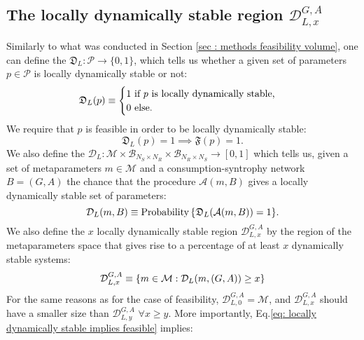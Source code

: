 \documentclass[12pt, titlepage]{report}
\begin{document}
\subsection{The locally dynamically stable region \texorpdfstring{$\mathcal{D}^{G,A}_{L,x}$}{DLx}} \label{sec: dynamical stability methods locally dynamically stable region}
Similarly to what was conducted in Section \ref{sec : methods feasibility volume}, one can define the  $\mathfrak{D}_L: \mathcal{P} \rightarrow \{
0,1\}$, which tells us whether a given set of parameters $p \in \mathcal{P}$ is locally dynamically stable or not:
\begin{equation}
\mathfrak{D}_L(p)\equiv\begin{cases}
1 \text{ if } p \text{ is locally dynamically stable,} \\
0 \text{ else.}
\end{cases}
\end{equation}
We require that $p$ is feasible in order to be locally dynamically stable:
\begin{equation}
\mathfrak{D}_L(p)=1 \implies \mathfrak{F}(p)=1. \label{eq: locally dynamically stable implies feasible}
\end{equation}
We also define the  $\mathcal{D}_L: \mathcal{M} \times \mathcal{B}_{N_S \times N_R} \times \mathcal{B}_{N_R \times N_S} \rightarrow [0,1]$ which tells us, given a set of metaparameters $m \in \mathcal{M}$ and a consumption-syntrophy network $B=(G,A)$ the chance that the procedure $\mathcal{A}(m,B)$ gives a locally dynamically stable set of parameters:
\begin{equation}
{\mathcal{D}_L(m, B)\equiv\text{Probability}\left\{\mathfrak{D}_L(\mathcal{A}(m, B))=1\right\}}. \label{eq : dyn stab methods dynamical stability function}
\end{equation}
We also define the $x$ locally dynamically stable region $\mathcal{D}_{L,x}^{G,A}$ by the region of the metaparameters space that gives rise to a percentage of at least $x$ dynamically stable systems:
\begin{equation}
\mathcal{D}_{L,x}^{G,A} \equiv \left\{m \in \mathcal{M}: \mathcal{D}_L(m, (G,A)) \geq x \right\}
\end{equation}
For the same reasons as for the case of feasibility, $\mathcal{D}_{L,0}^{G,A}=\mathcal{M}$, and $\mathcal{D}_{L,x}^{G,A}$ should have a smaller size than $\mathcal{D}_{L,y}^{G,A}$ $\forall x \geq y$. More importantly, Eq.\eqref{eq: locally dynamically stable implies feasible} implies:
\end{document}
